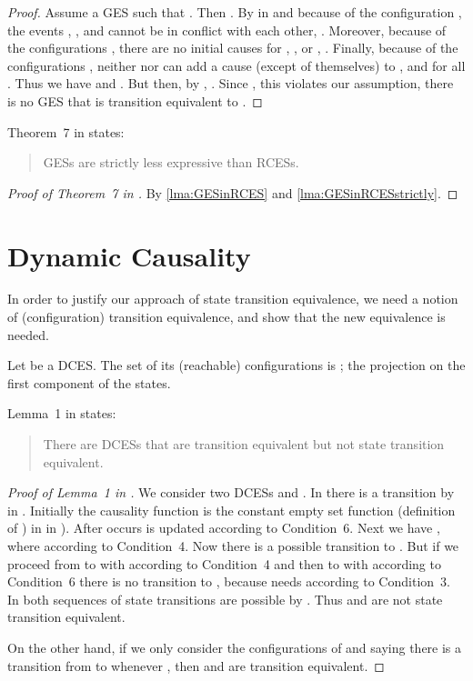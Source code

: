 \documentclass[runningheads,a4paper]{llncs}
\begin{document}
\begin{proof}
	Assume a GES  such that . Then .	By  in \cite{dynamicCausality15} and because of the configuration , the events , , and  cannot be in conflict with each other, \ie .	Moreover, because of the configurations , there are no initial causes for , , or , \ie . Finally, because of the configurations , neither  nor  can add a cause (except of themselves) to , \ie  and  for all .	Thus we have  and .	But then, by , . Since , this violates our assumption, \ie there is no GES that is transition equivalent to .
\end{proof}
Theorem~7 in \cite{dynamicCausality15} states:
\begin{quote}
	GESs are strictly less expressive than RCESs.
\end{quote}
\begin{proof}[Proof of Theorem~7 in \cite{dynamicCausality15}]
	By \lems\ref{lma:GESinRCES} and \ref{lma:GESinRCESstrictly}.
\end{proof}
\section{Dynamic Causality}
In order to justify our approach of state transition equivalence, we need a notion of (configuration) transition equivalence, and show that the new equivalence is needed.
\begin{definition}
\label{def:DCESConfigs}
Let  be a DCES. The set of its (reachable) configurations is
; the projection on the first component of the states.
\end{definition}
Lemma~1 in \cite{dynamicCausality15} states:
\begin{quote}
	There are DCESs that are transition equivalent but not state transition equivalent.
\end{quote}
\begin{proof}[Proof of Lemma~1 in \cite{dynamicCausality15}]
We consider two DCESs
	 and
	.
In  there is a transition 
by  in \cite{dynamicCausality15}. Initially the causality function is the
constant empty set function (\cf definition of ) in
 in \cite{dynamicCausality15}). After  occurs
 is updated according to
 Condition~6. Next we have
, where 
 according to
Condition~4. Now there is a possible transition to
. But if we
proceed from  to  with
 according to
Condition~4 and then to  with
 according to Condition~6 there is no transition to , because  needs  according to Condition~3.
In   both sequences of state transitions are possible by . Thus  and  are not state transition equivalent.

On the other hand, if we only consider the configurations of  and  saying there is a transition from  to  whenever , then  and  are transition equivalent.
\end{proof}
\end{document}
